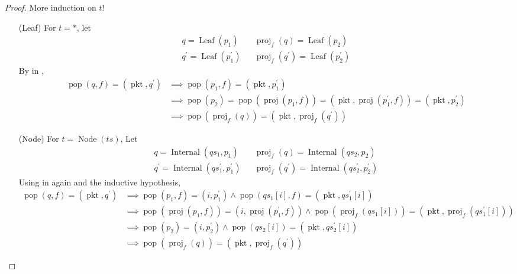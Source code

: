 \documentclass{amsart}
\DeclareMathOperator{\pkt}{\mathrm{pkt}}
\DeclareMathOperator{\pop}{\mathrm{pop}}
\DeclareMathOperator{\proj}{\mathrm{proj}}
\DeclareMathOperator{\Leaf}{\mathrm{Leaf}}
\DeclareMathOperator{\Internal}{\mathrm{Internal}}
\DeclareMathOperator{\Node}{\mathrm{Node}}
\theoremstyle{definition}
\begin{document}
\begin{proof}
    More induction on $t$!
    \begin{itemize}
        \item[(Leaf)] For $t = \ast$, let
            \begin{align*}
                q = \Leaf(p_1) && \proj_f(q) = \Leaf(p_2)\\
                q^{\prime} = \Leaf(p_1^\prime) && \proj_f(q^\prime) = \Leaf(p_2^\prime)
            \end{align*}
            By  in ,
            \begin{align*}
                \pop(q, f) = (\pkt, q^\prime) &\implies \pop(p_1, f) = (\pkt, p_1^\prime)\\
                                              &\implies \pop(p_2) = \pop(\proj(p_1, f)) = (\pkt, \proj(p_1^\prime, f)) = (\pkt, p_2^\prime)\\
                                              &\implies \pop(\proj_f(q)) = (\pkt, \proj_f(q^\prime))
            \end{align*}

        \item[(Node)] For $t = \Node(ts)$, Let
            \begin{align*}
                q = \Internal(qs_1, p_1) && \proj_f(q) = \Internal(qs_2, p_2)\\
                q^{\prime} = \Internal(qs_1^\prime, p_1^\prime) && \proj_f(q^\prime) = \Internal(qs_2^\prime, p_2^\prime)
            \end{align*}
            Using  in  again and the inductive hypothesis,
            \begin{align*}
                \pop(q, f) = (\pkt, q^\prime) &\implies \pop(p_1, f) = (i, p_1^\prime) \land \pop(qs_1[i], f) = (\pkt, qs_1^\prime[i])\\
                                              &\implies \pop(\proj(p_1, f)) = (i, \proj(p_1^\prime, f)) \land \pop(\proj_f(qs_1[i])) = (\pkt, \proj_f(qs_1^\prime[i]))\\
                                              &\implies \pop(p_2) = (i, p_2^\prime) \land \pop(qs_2[i]) = (\pkt, qs_2^\prime[i])\\
                                              &\implies \pop(\proj_f(q)) = (\pkt, \proj_f(q^\prime))
            \end{align*}
    \end{itemize}
\end{proof}
\end{document}
